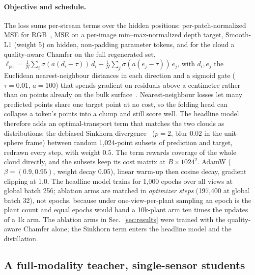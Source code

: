 \paragraph{Objective and schedule.}
The loss sums per-stream terms over the hidden positions: per-patch-normalized
MSE for RGB~\cite{he2022mae}, MSE on a per-image min--max-normalized depth
target, Smooth-L1 (weight 5) on hidden, non-padding parameter tokens, and for
the cloud a quality-aware Chamfer on the full regenerated set,
$\ell_{\mathrm{pc}}=\frac1N\sum_i\sigma(a(d_i-\tau))\,d_i+\frac1N\sum_j\sigma(a(e_j-\tau))\,e_j$,
with $d_i,e_j$ the Euclidean nearest-neighbour distances in each direction and
a sigmoid gate ($\tau{=}0.01$, $a{=}100$) that spends gradient on residuals
above a centimetre rather than on points already on the bulk
surface~\cite{wu2021dcd,song2026chamfer}. Nearest-neighbour losses let many
predicted points share one target point at no cost, so the folding head can
collapse a token's points into a clump and still score well. The headline
model therefore adds an optimal-transport term that matches the two clouds as
distributions: the debiased Sinkhorn divergence~\cite{feydy2019sinkhorn}
($p{=}2$, blur $0.02$ in the unit-sphere frame) between random 1{,}024-point
subsets of prediction and target, redrawn every step, with weight $0.5$. The
term rewards coverage of the whole cloud directly, and the subsets keep its
cost matrix at $B\times1024^2$.  AdamW ($\beta{=}(0.9,0.95)$, weight
decay 0.05), linear warm-up then cosine decay, gradient clipping at 1.0. The
headline model trains for 1{,}000 epochs over all views at global batch 256;
ablation arms are matched in \emph{optimizer steps} (197{,}400 at global batch
32), not epochs, because under one-view-per-plant sampling an epoch is the
plant count and equal epochs would hand a 10k-plant arm ten times the updates
of a 1k arm. The ablation arms in Sec.~\ref{sec:results} were trained with the
quality-aware Chamfer alone; the Sinkhorn term enters the headline model and
the distillation.

\subsection{A full-modality teacher, single-sensor students}
\label{sec:distill}

